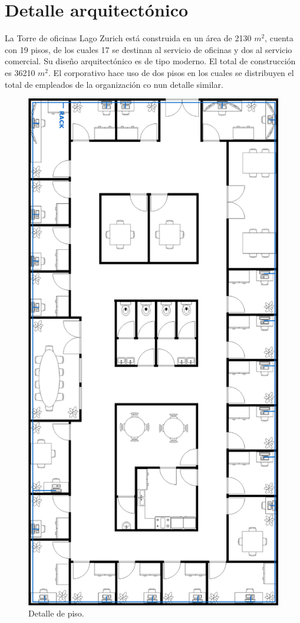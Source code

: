 \documentclass[12pt,letterpaper]{article}
\begin{document}
\section{Detalle arquitectónico}
La Torre de oficinas Lago Zurich está construida en un área de 2130 $m^2$, cuenta con 19 pisos, 
de los cuales 17 se destinan al servicio de oficinas y dos al servicio comercial. Su diseño 
arquitectónico es de tipo moderno. El total de construcción es 36210 $m^2$. El corporativo hace 
uso de dos pisos en los cuales se distribuyen el total de empleados de la organización co nun detalle similar.
\begin{figure}[ht]
    \centering
    \includegraphics[scale=.75]{imagenes/detalle.png}
    \caption{Detalle de piso.}
\end{figure}
\end{document}
